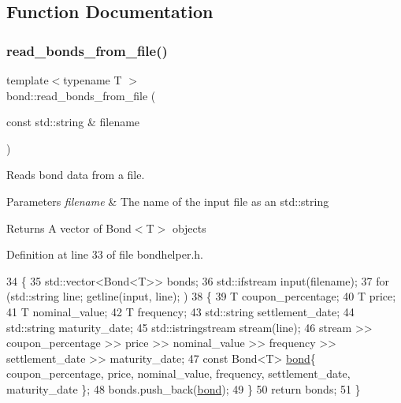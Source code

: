 \subsection{Function Documentation}
\mbox{\label{namespacebond_a20b23f0d31139a065334fd997507b1ae}} 
\subsubsection{\texorpdfstring{read\+\_\+bonds\+\_\+from\+\_\+file()}{read\_bonds\_from\_file()}}
{\footnotesize\ttfamily template$<$typename T $>$ \\
bond\+::read\+\_\+bonds\+\_\+from\+\_\+file (\begin{DoxyParamCaption}\item[{const std\+::string \&}]{filename }\end{DoxyParamCaption})}



Reads bond data from a file. 


\begin{DoxyParams}{Parameters}
{\em filename} & The name of the input file as an std\+::string \\
\hline
\end{DoxyParams}
\begin{DoxyReturn}{Returns}
A vector of Bond$<$\+T$>$ objects 
\end{DoxyReturn}


Definition at line 33 of file bondhelper.\+h.


\begin{DoxyCode}
34     \{
35         std::vector<Bond<T>> bonds;
36         std::ifstream input(filename);
37         \textcolor{keywordflow}{for} (std::string line; getline(input, line); )
38         \{
39             T coupon\_percentage;
40             T price;
41             T nominal\_value;
42             T frequency;
43             std::string settlement\_date;
44             std::string maturity\_date;
45             std::istringstream stream(line);
46             stream >> coupon\_percentage >> price >> nominal\_value >> frequency >> settlement\_date >> 
      maturity\_date;
47             \textcolor{keyword}{const} Bond<T> \hyperlink{namespacebond}{bond}\{ coupon\_percentage, price, nominal\_value, frequency, settlement\_date, 
      maturity\_date \};
48             bonds.push\_back(\hyperlink{namespacebond}{bond});
49         \}
50         \textcolor{keywordflow}{return} bonds;
51     \}
\end{DoxyCode}
